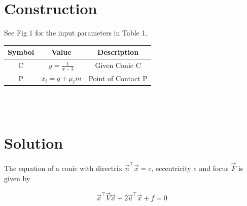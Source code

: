 \documentclass[journal,12pt,twocolumn]{IEEEtran}
\begin{document}
 \section*{Construction}
 
See Fig 1 for the input parameters in Table 1.\\
\vspace{0.5cm}
{\setlength\extrarowheight{2pt}
\begin{tabular}{|c|c|c|}
	\hline
	\textbf{Symbol}&\textbf{Value}&\textbf{Description}\\
	\hline
	C & $y = \frac{1}{x-3}$ & Given Conic C\\
	\hline
	P & $x_i = q + \mu_i m$ & Point of Contact P\\
	\hline
\end{tabular}
}\\
\vspace{0.25cm}
\\
\section{Solution}
\begin{flushleft}
The equation of  a conic with directrix $\vec{n}^{\top}\vec{x} = c$, eccentricity $e$ and focus $\vec{F}$ is given by 
\end{flushleft}
\begin{align}
    \vec{x}^{\top}\vec{V}\vec{x}+2\vec{u}^{\top}\vec{x}+f=0
\end{align}    
\end{document}
